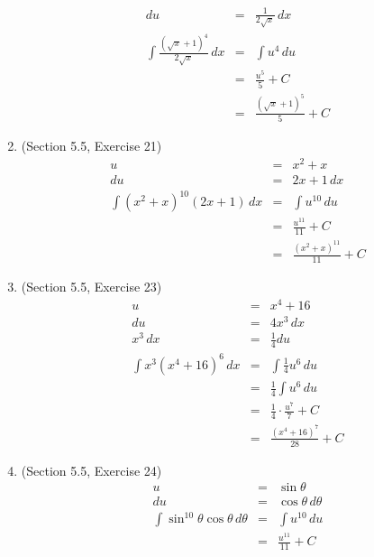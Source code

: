 \documentclass{article}
\begin{document}
\begin{enumerate}
\begin{eqnarray}
            du &=& \frac{1}{2\sqrt{x}}\,dx \\
            \int{\frac{\left(\sqrt{x} + 1\right)^4}{2\sqrt{x}}\,dx} &=& \int{u^4\,du} \\
                                                                    &=& \frac{u^5}{5} + C \\
                                                                    &=& \frac{\left(\sqrt{x} + 1\right)^5}{5} + C
        \end{eqnarray}
    \item (Section 5.5, Exercise 21)
        \begin{eqnarray}
            u &=& x^2 + x \\
            du &=& 2x + 1\,dx \\
            \int{\left(x^2 + x\right)^{10}\left(2x + 1\right)\,dx} &=& \int{u^{10}\,du} \\
                                                                   &=& \frac{u^{11}}{11} + C \\
                                                                   &=& \frac{\left(x^2 + x\right)^{11}}{11} + C
        \end{eqnarray}
    \item (Section 5.5, Exercise 23)
        \begin{eqnarray}
            u &=& x^4 + 16 \\
            du &=& 4x^3\,dx \\
            x^3\,dx &=& \frac{1}{4}du \\
            \int{x^3\left(x^4 + 16\right)^6\,dx} &=& \int{\frac{1}{4}u^6\,du} \\
                                                 &=& \frac{1}{4}\int{u^6\,du} \\
                                                 &=& \frac{1}{4}\cdot\frac{u^7}{7} + C \\
                                                 &=& \frac{\left(x^4 + 16\right)^7}{28} + C
        \end{eqnarray}
    \item (Section 5.5, Exercise 24)
        \begin{eqnarray}
            u &=& \sin{\theta} \\
            du &=& \cos{\theta}\,d\theta \\
            \int{\sin^{10}{\theta}\cos{\theta}\,d\theta} &=& \int{u^{10}\,du} \\
                                                         &=& \frac{u^{11}}{11} + C \\

\end{eqnarray}
\end{enumerate}
\end{document}
